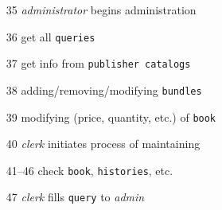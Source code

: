 \documentclass[a4paper,10pt,notitlepage,headsepline,pdftex,twocolumn]{scrartcl}
\begin{document}
\begin{enumerate}
  \item[35] \emph{administrator} begins administration
  \item[36] get all \texttt{queries}
  \item[37] get info from \texttt{publisher catalogs}
  \item[38] adding/removing/modifying \texttt{bundles}
  \item[39] modifying (price, quantity, etc.) of \texttt{book}
  \item[40] \emph{clerk} initiates process of maintaining
  \item[41--46] check \texttt{book}, \texttt{histories}, etc.
  \item[47] \emph{clerk} fills \texttt{query} to \emph{admin}
\end{enumerate}
\end{document}
